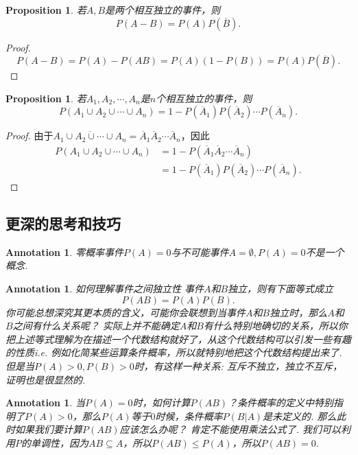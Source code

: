 \documentclass{article}
\newtheorem{proposition}[theorem]{Proposition}
\newtheorem{annotation}[theorem]{Annotation}
\begin{document}
\begin{proposition}
\rm 若$A,B$是两个相互独立的事件，则
$$
P(A-B) = P(A)P(\overline{B}).
$$
\end{proposition}

\begin{proof}
\rm 
$$
P(A-B) = P(A)-P(AB) = P(A)(1-P(B)) = P(A)P(\overline{B}).
$$
\end{proof}

\begin{proposition}
\rm 若$A_1,A_2,\cdots,A_n$是$n$个相互独立的事件，则
$$
P(A_1 \cup A_2 \cup \cdots \cup A_n) = 1-P(\overline{A}_1)P(\overline{A}_2)\cdots P(\overline{A}_n). 
$$
\end{proposition}

\begin{proof}
由于$\overline{A_1\cup A_2 \cup \cdots \cup A_n} = \overline{A}_1\overline{A}_2\cdots\overline{A}_n$，因此
$$
\begin{array}{ll}
P(A_1 \cup A_2 \cup \cdots \cup A_n) &= 1-P(\overline{A}_1\overline{A}_2\cdots\overline{A}_n)\\
&= 1 - P(\overline{A}_1)P(\overline{A}_2)\cdots P(\overline{A}_n).
\end{array}
$$
\end{proof}



\newpage
\subsection{更深的思考和技巧}

\begin{annotation}
\rm {\color{red} 零概率事件$P(A) = 0$与不可能事件$A=\emptyset,P(A) = 0$不是一个概念}.
\end{annotation}


\begin{annotation}
\rm {\color{red} 如何理解事件之间独立性} 事件$A$和$B$独立，则有下面等式成立
$$
P(AB) = P(A)P(B). 
$$
你可能总想深究其更本质的含义，可能你会联想到当事件$A$和$B$独立时，那么$A$和$B$之间有什么关系呢？ 实际上并{\color{blue}不能确定$A$和$B$有什么特别地确切的关系}，所以你把上述等式理解为在描述一个代数结构就好了，从这个代数结构可以引发一些有趣的性质i.e. 例如化简某些运算{\color{blue}条件概率}，所以就特别地把这个代数结构提出来了. 但是当$P(A)>0, P(B) > 0$时，有这样一种关系: {\color{red} 互斥不独立，独立不互斥}，证明也是很显然的.
\end{annotation}

\begin{annotation}
\rm {\color{red} 当$P(A) = 0$时，如何计算$P(AB)$？}条件概率的定义中特别指明了$P(A) > 0$，那么$P(A)$等于$0$时候，条件概率$P(B|A)$是未定义的. 那么此时如果我们要计算$P(AB)$应该怎么办呢？ 肯定不能使用乘法公式了. 我们可以利用$P$的{\color{blue}单调性}，因为$AB \subseteq A$，所以$P(AB) \leq P(A)$，所以$P(AB)=0$.
\end{annotation}
\end{document}
